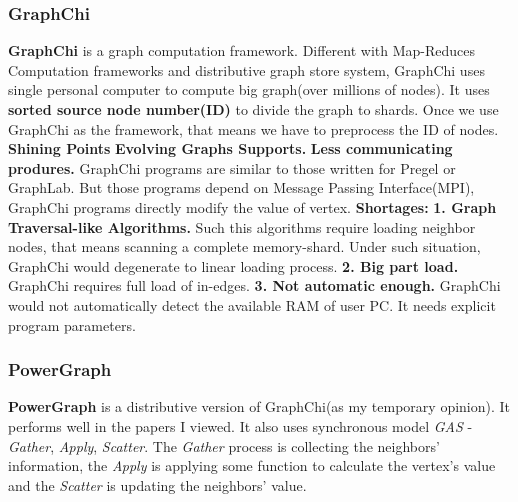 \documentclass{article}
\begin{document}
	\subsubsection{GraphChi}
	\textbf{GraphChi}\cite{kyrola2012graphchi:} is a graph computation framework. Different with Map-Reduces Computation frameworks and distributive graph store system, GraphChi uses single personal computer to compute big graph(over millions of nodes). It uses \textbf{sorted source node number(ID)} to divide the graph to shards. Once we use GraphChi as the framework, that means we have to preprocess the ID of nodes.
	\newline
	\textbf{Shining Points}
	\newline
	\textbf{Evolving Graphs Supports.}
	\newline
	\textbf{Less communicating produres.} GraphChi programs are similar to those written for Pregel\cite{malewicz2009pregel:} or GraphLab\cite{low2014graphlab:}. But those programs depend on Message Passing Interface(MPI)\cite{meyer1993message-passing}, GraphChi programs directly modify the value of vertex.
	\newline
	\textbf{Shortages:}
	\newline
	\textbf{1. Graph Traversal-like Algorithms.} Such this algorithms require loading neighbor nodes, that means scanning a complete memory-shard. Under such situation, GraphChi would degenerate to linear loading process.
	\newline
	\textbf{2. Big part load.} GraphChi requires full load of in-edges.
	\newline
	\textbf{3. Not automatic enough.} GraphChi would not automatically detect the available RAM of user PC. It needs explicit program parameters.

	\subsubsection{PowerGraph}
	\textbf{PowerGraph}\cite{gonzalez2012powergraph:} is a distributive version of GraphChi(as my temporary opinion). It performs well in the papers I viewed. It also uses synchronous model \emph{GAS} - \emph{Gather}, \emph{Apply}, \emph{Scatter}. The \emph{Gather} process is collecting the neighbors' information, the \emph{Apply} is applying some function to calculate the vertex's value and the \emph{Scatter} is updating the neighbors' value.
\end{document}
